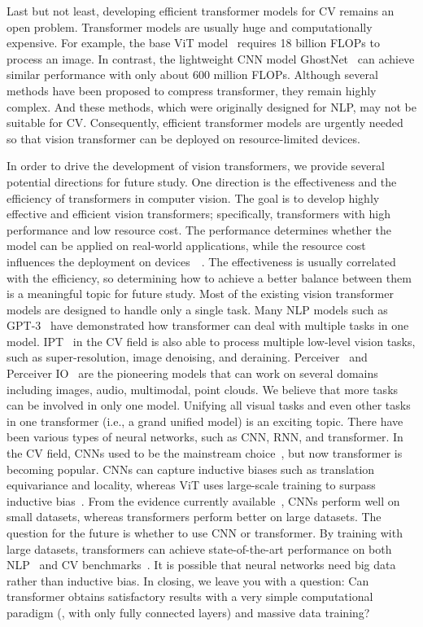 Last but not least, developing efficient transformer models for CV remains an open problem. Transformer models are usually huge and computationally expensive. For example, the base ViT model~ requires 18 billion FLOPs to process an image. In contrast, the lightweight CNN model GhostNet~ can achieve similar performance with only about 600 million FLOPs. Although several methods have been proposed to compress transformer, they remain highly complex. And these methods, which were originally designed for NLP, may not be suitable for CV. Consequently, efficient transformer models are urgently needed so that vision transformer can be deployed on resource-limited devices.

In order to drive the development of vision transformers, we provide several potential directions for future study.
One direction is the effectiveness and the efficiency of transformers in computer vision. The goal is to develop highly effective and efficient vision transformers; specifically, transformers with high performance and low resource cost. The performance determines whether the model can be applied on real-world applications, while the resource cost influences the deployment on devices~~. The effectiveness is usually correlated with the efficiency, so determining how to achieve a better balance between them is a meaningful topic for future study.
Most of the existing vision transformer models are designed to handle only a single task. Many NLP models such as GPT-3~ have demonstrated how transformer can deal with multiple tasks in one model. IPT~ in the CV field is also able to process multiple low-level vision tasks, such as super-resolution, image denoising, and deraining. Perceiver~ and Perceiver IO~ are the pioneering models that can work on several domains including images, audio, multimodal, point clouds. We believe that more tasks can be involved in only one model. Unifying all visual tasks and even other tasks in one transformer (i.e., a grand unified model) is an exciting topic.
There have been various types of neural networks, such as CNN, RNN, and transformer. In the CV field, CNNs used to be the mainstream choice~, but now transformer is becoming popular. CNNs can capture inductive biases such as translation equivariance and locality, whereas ViT uses large-scale training to surpass inductive bias~. From the evidence currently available~, CNNs perform well on small datasets, whereas transformers perform better on large datasets. The question for the future is whether to use CNN or transformer.
By training with large datasets, transformers can achieve state-of-the-art performance on both NLP~ and CV benchmarks~. It is possible that neural networks need big data rather than inductive bias. In closing, we leave you with a question: Can transformer obtains satisfactory results with a very simple computational paradigm (\eg, with only fully connected layers) and massive data training?
